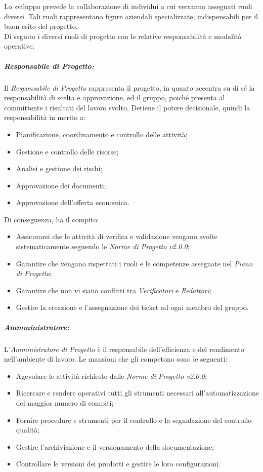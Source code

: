 Lo sviluppo prevede la collaborazione di individui a cui verranno assegnati ruoli diversi. Tali ruoli rappresentano figure aziendali specializzate, indispensabili per il buon esito del progetto.\\
Di seguito i diversi ruoli di progetto con le relative responsabilità e modalità operative.
\subparagraph{Responsabile di Progetto:}
Il \textit{Responsabile di Progetto} rappresenta il progetto, in quanto accentra su di sé la responsabilità di scelta e approvazione, ed il gruppo, poiché presenta al committente i risultati del lavoro svolto.
Detiene il potere decisionale, quindi la responsabilità in merito a:
\begin{itemize}
	\item Pianificazione, coordinamento e controllo delle attività;
	\item Gestione e controllo delle risorse;
	\item Analisi e gestione dei rischi;
	\item Approvazione dei documenti;
	\item Approvazione dell'offerta economica.
\end{itemize}
Di conseguenza, ha il compito:
\begin{itemize}
	\item Assicurarsi che le attività di verifica e validazione vengano svolte sistematicamente seguendo le \textit{Norme di Progetto v2.0.0};
	\item Garantire che vengano rispettati i ruoli e le competenze assegnate nel \textit{Piano di Progetto};
	\item Garantire che non vi siano conflitti tra \textit{Verificatori} e \textit{Redattori};
	\item Gestire la creazione e l'assegnazione dei \gls{ticket} ad ogni membro del gruppo.
\end{itemize}
\subparagraph{Ammministratore:}
L'\textit{Amministratore di Progetto} è il responsabile dell'efficienza e del rendimento nell'ambiente di lavoro. Le mansioni che gli competono sono le seguenti:
\begin{itemize}
	\item Agevolare le attività richieste dalle \textit{Norme di Progetto v2.0.0};
	\item Ricercare e rendere operativi tutti gli strumenti necessari all'automatizzazione del maggior numero di compiti;
	\item Fornire procedure e strumenti per il controllo e la segnalazione del controllo qualità;
	\item Gestire l'archiviazione e il \gls{versionamento} della documentazione;
	\item Controllare le versioni dei prodotti e gestire le loro configurazioni.
\end{itemize}
